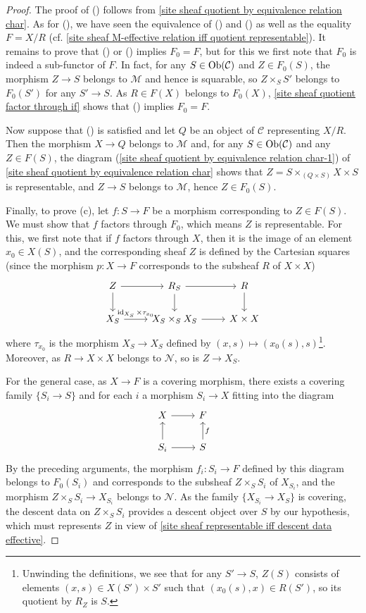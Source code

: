 \begin{proof}
The proof of () follows from \cref{site sheaf quotient by equivalence relation char}. As for (), we have seen the equivalence of () and () as well as the equality $F=X/R$ (cf. \cref{site sheaf M-effective relation iff quotient representable}). It remains to prove that () or () implies $F_0=F$, but for this we first note that $F_0$ is indeed a sub-functor of $F$. In fact, for any $S\in\mathrm{Ob}(\mathcal{C})$ and $Z\in F_0(S)$, the morphism $Z\to S$ belongs to $\mathcal{M}$ and hence is squarable, so $Z\times_SS'$ belongs to $F_0(S')$ for any $S'\to S$. As $R\in F(X)$ belongs to $F_0(X)$, \cref{site sheaf quotient factor through if} shows that () implies $F_0=F$.\par
Now suppose that () is satisfied and let $Q$ be an object of $\mathcal{C}$ representing $X/R$. Then the morphism $X\to Q$ belongs to $\mathcal{M}$ and, for any $S\in\mathrm{Ob}(\mathcal{C})$ and any $Z\in F(S)$, the diagram (\ref{site sheaf quotient by equivalence relation char-1}) of \cref{site sheaf quotient by equivalence relation char} shows that $Z=S\times_{(Q\times S)}X\times S$ is representable, and $Z\to S$ belongs to $\mathcal{M}$, hence $Z\in F_0(S)$.\par
Finally, to prove (c), let $f:S\to F$ be a morphism corresponding to $Z\in F(S)$. We must show that $f$ factors through $F_0$, which means $Z$ is representable. For this, we first note that if $f$ factors through $X$, then it is the image of an element $x_0\in X(S)$, and the corresponding sheaf $Z$ is defined by the Cartesian squares (since the morphism $p:X\to F$ corresponds to the subsheaf $R$ of $X\times X$)
\[\begin{tikzcd}
Z\ar[r]\ar[d]&R_S\ar[r]\ar[d]&R\ar[d]\\
X_S\ar[r,"{\id_{X_S}\times\tau_{x_0}}"]&X_S\times_SX_S\ar[r]&X\times X
\end{tikzcd}\]
where $\tau_{x_0}$ is the morphism $X_S\to X_S$ defined by $(x,s)\mapsto(x_0(s),s)$\footnote{Unwinding the definitions, we see that for any $S'\to S$, $Z(S)$ consists of elements $(x,s)\in X(S')\times S'$ such that $(x_0(s),x)\in R(S')$, so its quotient by $R_Z$ is $S$.}. Moreover, as $R\to X\times X$ belongs to $\mathcal{N}$, so is $Z\to X_S$.\par
For the general case, as $X\to F$ is a covering morphism, there exists a covering family $\{S_i\to S\}$ and for each $i$ a morphism $S_i\to X$ fitting into the diagram
\[\begin{tikzcd}
X\ar[r]&F\\
S_i\ar[r]\ar[u]&S\ar[u,swap,"f"]
\end{tikzcd}\]
By the preceding arguments, the morphism $f_i:S_i\to F$ defined by this diagram belongs to $F_0(S_i)$ and corresponds to the subsheaf $Z\times_SS_i$ of $X_{S_i}$, and the morphism $Z\times_SS_i\to X_{S_i}$ belongs to $\mathcal{N}$. As the family $\{X_{S_i}\to X_S\}$ is covering, the descent data on $Z\times_SS_i$ provides a descent object over $S$ by our hypothesis, which must represents $Z$ in view of \cref{site sheaf representable iff descent data effective}.
\end{proof}

